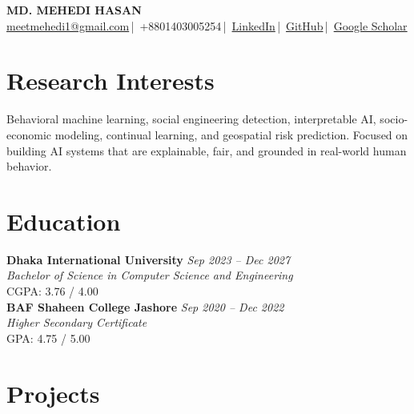 \documentclass[a4paper,11pt]{article}
\begin{document}
\pagestyle{empty}

\begin{center}
\textbf{\Large MD. MEHEDI HASAN} \\[3pt]
\footnotesize
\href{mailto:meetmehedi1@gmail.com}{meetmehedi1@gmail.com}\,|\,
+8801403005254\,|\,
\href{https://www.linkedin.com/in/meetmehedi}{LinkedIn}\,|\,
\href{https://github.com/meetmehedi}{GitHub}\,|\,
\href{https://scholar.google.com/citations?user=xeVGjNsAAAAJ&hl=en}{Google Scholar}
\end{center}

\section{Research Interests}
Behavioral machine learning, social engineering detection, interpretable AI, socio-economic modeling, continual learning, and geospatial risk prediction. Focused on building AI systems that are explainable, fair, and grounded in real-world human behavior.

\section{Education}

\textbf{Dhaka International University} \hfill \textit{Sep 2023 -- Dec 2027} \\
\textit{Bachelor of Science in Computer Science and Engineering} \\
CGPA: 3.76 / 4.00 \\

\textbf{BAF Shaheen College Jashore} \hfill \textit{Sep 2020 -- Dec 2022} \\
\textit{Higher Secondary Certificate} \\
GPA: 4.75 / 5.00

\section{Projects}
\end{document}
